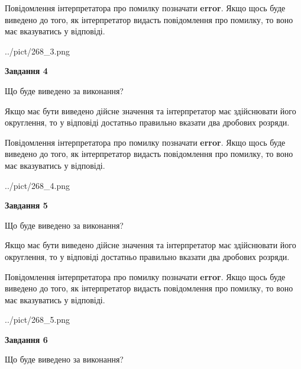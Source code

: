 \documentclass[12pt, ukrainian]{article}
\begin{document}
{\begin {Large}
Повідомлення інтерпретатора про помилку позначати \textbf{error}.
Якщо щось буде виведено до того, як інтерпретатор видасть повідомлення про помилку, 
то воно має вказуватись у відповіді. \par

\begin{center}
	{../pict/268_3.png}
\end{center}
\newpage

{\begin {center}\textbf{Завдання 4}\end {center}}\par
Що буде виведено за виконання? \par

Якщо має бути виведено дійсне значення та інтерпретатор має здійснювати його округлення, 
то у відповіді достатньо правильно вказати два дробових розряди.

Повідомлення інтерпретатора про помилку позначати \textbf{error}.
Якщо щось буде виведено до того, як інтерпретатор видасть повідомлення про помилку, 
то воно має вказуватись у відповіді. \par

\begin{center}
	{../pict/268_4.png}
\end{center}
\newpage

{\begin {center}\textbf{Завдання 5}\end {center}}\par
Що буде виведено за виконання? \par

Якщо має бути виведено дійсне значення та інтерпретатор має здійснювати його округлення, 
то у відповіді достатньо правильно вказати два дробових розряди.

Повідомлення інтерпретатора про помилку позначати \textbf{error}.
Якщо щось буде виведено до того, як інтерпретатор видасть повідомлення про помилку, 
то воно має вказуватись у відповіді. \par

\begin{center}
	{../pict/268_5.png}
\end{center}
\newpage

{\begin {center}\textbf{Завдання 6}\end {center}}\par
Що буде виведено за виконання? \par


\end{Large}}
\end{document}
